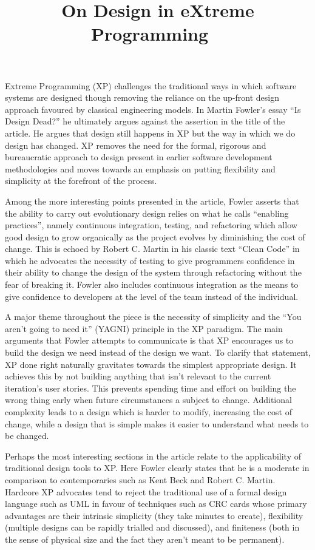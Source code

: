 \documentclass[paper=a4, fontsize=11pt]{scrartcl}	%
\title{
	\vspace{-0.5in} 	\usefont{OT1}{bch}{b}{n}
	 On Design in eXtreme Programming \
}
\author{}
\date{}
\numberwithin{equation}{section}															%
\numberwithin{figure}{section}																%
\numberwithin{table}{section}
\begin{document}
\maketitle
Extreme Programming (XP) challenges the traditional ways in which software systems are designed though removing the reliance on the up-front design approach favoured by classical engineering models. In Martin Fowler's essay ``Is Design Dead?'' \cite{fowler2004design} he ultimately argues against the assertion in the title of the article. He argues that design still happens in XP but the way in which we do design has changed. XP removes the need for the formal, rigorous and bureaucratic approach to design present in earlier software development methodologies and moves towards an emphasis on  putting flexibility and simplicity at the forefront of the process.

Among the more interesting points presented  in the article, Fowler asserts that the ability to carry out evolutionary design relies on what he calls ``enabling practices'', namely continuous integration, testing, and refactoring which allow good design to grow organically as the project evolves by diminishing the cost of change. This is echoed by Robert C. Martin in his classic text ``Clean Code'' \cite{martin2008clean} in which he advocates the necessity of testing to give programmers confidence in their ability to change the design of the system through refactoring without the fear of breaking it. Fowler also includes continuous integration as the means to give confidence to developers at the level of the team instead of the individual.

A major theme throughout the piece is the necessity of simplicity and the ``You aren't going to need it'' (YAGNI) principle in the XP paradigm. The main arguments that Fowler attempts to communicate is that XP encourages us to build the design we need instead of the design we want. To clarify that statement, XP done right naturally gravitates towards the simplest appropriate design. It achieves this by not building anything that isn't relevant to the current iteration's user stories. This prevents spending time and effort on building the wrong thing early when future circumstances a subject to change. Additional complexity leads to a design which is harder to modify, increasing the cost of change, while a design that is  simple makes it easier to understand what needs to be changed.

Perhaps the most interesting sections in the article relate to the applicability of traditional design tools to XP. Here Fowler clearly states that he is a moderate in comparison to contemporaries such as Kent Beck and Robert C. Martin. Hardcore XP advocates tend to  reject the traditional use of a formal design language such as UML in favour of techniques such as CRC cards \cite{wells1999crc, wells1999design} whose primary advantages are their intrinsic simplicity (they take minutes to create), flexibility (multiple designs can be rapidly trialled and discussed), and finiteness (both in the sense of physical size and the fact they aren't meant to be permanent).
\end{document}
